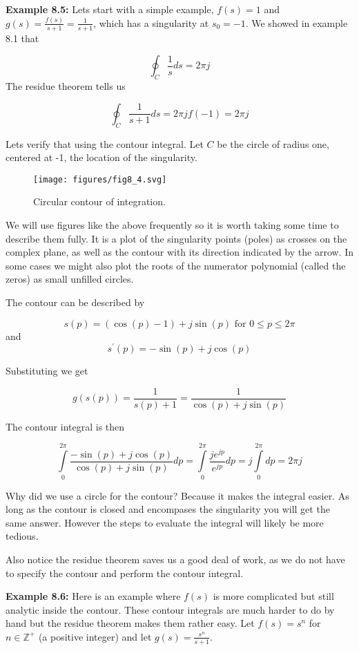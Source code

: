 \documentclass{article}
\begin{document}
\textbf{Example 8.5:} Lets start with a simple example, $f(s) = 1$ and $g(s) = \frac{f(s)}{s+1} = \frac{1}{s+1}$, which has a singularity at $s_0 = -1$. We showed in example 8.1 that

\[
\oint_C \frac{1}{s} ds = 2\pi j 
\]
The residue theorem tells us

\[
\oint_C \frac{1}{s+1} ds = 2\pi j f(-1) = 2\pi j 
\]

Lets verify that using the contour integral. Let $C$ be the circle of radius one, centered at -1, the location of the singularity.

\begin{figure}
  \centering
  \texttt{[image: figures/fig8\_4.svg]}
  \caption{Circular contour of integration.}
\end{figure}

We will use figures like the above frequently so it is worth taking some time to describe them fully. It is a plot of the singularity points (poles) as crosses on the complex plane, as well as the contour with its direction indicated by the arrow. In some cases we might also plot the roots of the numerator polynomial (called the zeros) as small unfilled circles.

The contour can be described by

\[
s(p) = (\cos(p) - 1) + j\sin(p) \text{ for } 0 \leq p \leq 2\pi
\]
and
\[
s^\prime(p) = -\sin(p) + j\cos(p)
\]

Substituting we get

\[
g(s(p)) = \frac{1}{s(p) + 1} = \frac{1}{\cos(p) + j\sin(p)}
\]

The contour integral is then

\[
\int\limits_{0}^{2\pi} \frac{-\sin(p) + j\cos(p)}{\cos(p) + j\sin(p)} dp = \int\limits_{0}^{2\pi} \frac{je^{jp}}{e^{jp}} dp = j \int\limits_{0}^{2\pi} dp = 2\pi j 
\]

Why did we use a circle for the contour? Because it makes the integral easier. As long as the contour is closed and encompases the singularity you will get the same answer. However the steps to evaluate the integral will likely be more tedious.

Also notice the residue theorem saves us a good deal of work, as we do not have to specify the contour and perform the contour integral.

\textbf{Example 8.6:} Here is an example where $f(s)$ is more complicated but still analytic inside the contour. These contour integrals are much harder to do by hand but the residue theorem makes them rather easy. Let $f(s) = s^n$ for $n\in\mathbb{Z}^+$ (a positive integer) and let $g(s) = \frac{s^n}{s+1}$.
\end{document}
